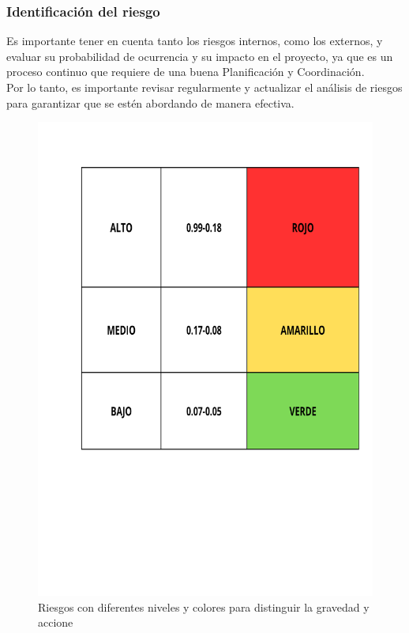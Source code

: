     \subsubsection{Identificación del riesgo}
    Es importante tener en cuenta tanto los riesgos internos, como los externos, y evaluar su probabilidad de ocurrencia y su impacto en el proyecto, ya que es un proceso continuo que requiere de una buena Planificación y Coordinación.\\
    Por lo tanto, es importante revisar regularmente y actualizar el análisis de riesgos para garantizar que se estén abordando de manera efectiva.
    \begin{figure}[H]
        \centering
        \includegraphics[trim = {20mm 40mm 20mm 25mm},clip,scale=0.25]{9/Img/nivelesRiesgos.pdf}
        \caption{Riesgos con diferentes niveles y colores para distinguir la gravedad y accione }
        \label{fig:bimanual}
    \end{figure}
